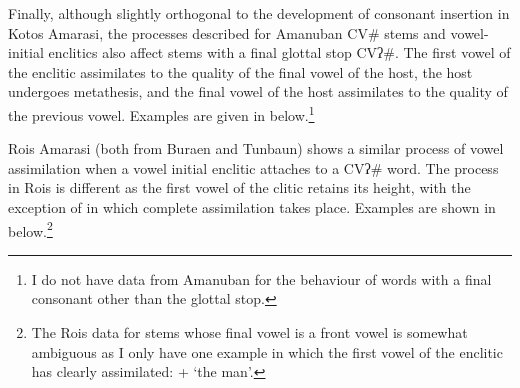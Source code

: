 Finally, although slightly orthogonal to the development
of consonant insertion in Kotos Amarasi,
the processes described for Amanuban CV{\#}
stems and vowel-initial enclitics also affect stems
with a final glottal stop CVʔ{\#}.
The first vowel of the enclitic assimilates to the quality
of the final vowel of the host, the host undergoes metathesis,
and the final vowel of the host assimilates to the quality of the previous vowel.
Examples are given in  below.\footnote{
		I do not have data from Amanuban for the behaviour
		of words with a final consonant other than the glottal stop.}

\newpage
\begin{exe}
	\label{ex:AmaVowAssGlot}
\end{exe}

Ro{\Q}is Amarasi (both from Buraen and Tunbaun)
shows a similar process of vowel assimilation
when a vowel initial enclitic attaches to a CVʔ{\#} word.
The process in Ro{\Q}is is different as the first
vowel of the clitic retains its height,
with the exception of  in which complete assimilation takes place.
Examples are shown in  below.\footnote{
		The Ro{\Q}is data for stems whose final vowel is a front vowel
		is somewhat ambiguous as I only have one example
		in which the first vowel of the enclitic has clearly assimilated:
		 +  {\ra}  `the man'.}

